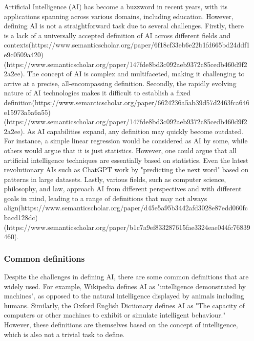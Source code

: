 \documentclass{article}
\begin{document}
Artificial Intelligence (AI) has become a buzzword in recent years, with its
applications spanning across various domains, including education. However,
defining AI is not a straightforward task due to several challenges. Firstly,
there is a lack of a universally accepted definition of AI across different
fields and contexts(https://www.semanticscholar.org/paper/6f18cf33eb6e22b1fd665bd24ddf1e9c0509a420)(https://www.semanticscholar.org/paper/147fde8bd3c092aeb9372c85cedb460d9f22a2ee).
The concept of AI is complex and multifaceted, making it challenging to arrive
at a precise, all-encompassing definition. Secondly, the rapidly evolving
nature of AI technologies makes it difficult to establish a fixed
definition(https://www.semanticscholar.org/paper/6624236a5ab39d57d2463fca646e15973a5a6a55)
(https://www.semanticscholar.org/paper/147fde8bd3c092aeb9372c85cedb460d9f22a2ee).
As AI capabilities expand, any definition may quickly become outdated.
For instance, a simple linear regression
would be considered as AI by some, while others would argue that it is
just statistics. However, one could argue that all
artificial intelligence techniques are essentially based on statistics.
Even the latest revolutionary AIs such as ChatGPT work by "predicting the next word" based
on patterns in large datasets. Lastly, various fields, such as computer
science, philosophy, and law, approach AI from different perspectives and
with different goals in mind, leading to a range of definitions that may
not always align(https://www.semanticscholar.org/paper/d45e5a95b3442afd3028e87edd060fcbacd128dc)
(https://www.semanticscholar.org/paper/b1c7a9ef833287615fae3324eae044fc76839460).

\subsubsection{Common definitions}

Despite the challenges in defining AI, there are some common definitions
that are widely used. For example, Wikipedia defines AI as "intelligence
demonstrated by machines", as opposed to the natural intelligence displayed
by animals including humans. Similarly, the Oxford English Dictionary
defines AI as "The capacity of computers or other machines to exhibit or
simulate intelligent behaviour." However, these definitions are themselves
based on the concept of intelligence, which is also not a trivial task to
define.
\end{document}
